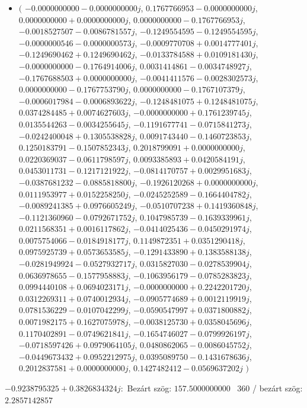 \documentclass[14pt,a4paper]{article}
\begin{document}
\begin{itemize}
\item
$\big($
$-0.0000000000-0.0000000000j$, $0.1767766953-0.0000000000j$, $0.0000000000+0.0000000000j$, $0.0000000000-0.1767766953j$, $-0.0018527507-0.0086781557j$, $-0.1249554595-0.1249554595j$, $-0.0000000546-0.0000000573j$, $-0.0009770708+0.0014777401j$, $-0.1249690462+0.1249690462j$, $-0.0133784588+0.0109181430j$, $-0.0000000000-0.1764914006j$, $0.0031414861-0.0034748927j$, $-0.1767688503+0.0000000000j$, $-0.0041411576-0.0028302573j$, $0.0000000000-0.1767753790j$, $0.0000000000-0.1767107379j$, $-0.0006017984-0.0006893622j$, $-0.1248481075+0.1248481075j$, $0.0374284485+0.0074627603j$, $-0.0000000000+0.1761239745j$, $0.0135544263-0.0034255645j$, $-0.1191677741-0.0715841273j$, $-0.0242400048+0.1305538828j$, $0.0091743440-0.1460723853j$, $0.1250183791-0.1507852343j$, $0.2018799091+0.0000000000j$, $0.0220369037-0.0611798597j$, $0.0093385893+0.0420584191j$, $0.0453011731-0.1217121922j$, $-0.0814170757+0.0029951683j$, $-0.0387681232-0.0885818800j$, $-0.1926120268+0.0000000000j$, $0.0111953977+0.0152258250j$, $-0.0245252589-0.1664404782j$, $-0.0089241385+0.0976605249j$, $-0.0510707238+0.1419360848j$, $-0.1121360960-0.0792671752j$, $0.1047985739-0.1639339961j$, $0.0211568351+0.0016117862j$, $-0.0414025436-0.0450291974j$, $0.0075754066-0.0184918177j$, $0.1149872351+0.0351290418j$, $0.0975925739+0.0573653585j$, $-0.1291433890+0.1383588138j$, $-0.0281949924-0.0527932717j$, $0.0315827030-0.0278539904j$, $0.0636978655-0.1577958883j$, $-0.1063956179-0.0785283823j$, $0.0994440108+0.0694023171j$, $-0.0000000000+0.2242201720j$, $0.0312269311+0.0740012934j$, $-0.0905774689+0.0012119919j$, $0.0781536229-0.0107042299j$, $-0.0590547997+0.0371800882j$, $0.0071982175+0.1627075978j$, $-0.0038125730+0.0358045696j$, $0.1170402891-0.0749621841j$, $-0.1654746027-0.0799926197j$, $-0.0718597426+0.0979064105j$, $0.0480862065-0.0086045752j$, $-0.0449673432+0.0952212975j$, $0.0395089750-0.1431678636j$, $0.2012837581+0.0000000000j$, $0.1427482412-0.0569637202j$
$\big)$
\end{itemize}
$-0.9238795325+0.3826834324j$:\
Bezárt szög: $157.5000000000$ \
360 / bezárt szög: $2.2857142857$\
\end{document}
